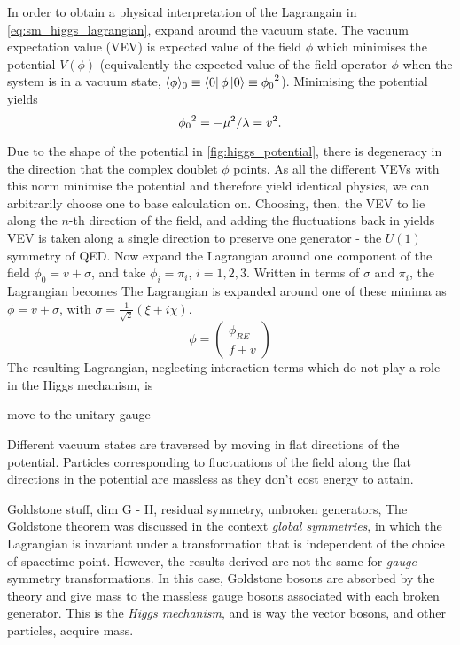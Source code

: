 In order to obtain a physical interpretation of the Lagrangain in \cref{eq:sm_higgs_lagrangian}, expand around the vacuum state.
The vacuum expectation value (VEV) is expected value of the field $\phi$ which minimises the potential $V(\phi)$ (equivalently the expected value of the field operator $\phi$ when the system is in a vacuum state, $\langle{\phi}\rangle_0 \equiv \left\langle 0 \right| \phi \left| 0 \right\rangle \equiv {\phi_0}^2$).
Minimising the potential yields
%
\begin{equation}\label{eq:higgs_vev}
  {\phi_0}^2 = -\mu^2 / \lambda = v^2 .
\end{equation}
%

Due to the shape of the potential in \cref{fig:higgs_potential}, there is degeneracy in the direction that the complex doublet $\phi$ points.
As all the different VEVs with this norm minimise the potential and therefore yield identical physics, we can arbitrarily choose one to base calculation on.
Choosing, then, the VEV to lie along the $n$\nobreakdash-th direction of the field, and adding the fluctuations back in yields
VEV is taken along a single direction to preserve one generator - the $U(1)$ symmetry of QED.
Now expand the Lagrangian around one component of the field $\phi_0 = v + \sigma$, and take $\phi_i = \pi_i$, $i = 1,2,3$. 
Written in terms of $\sigma$ and $\pi_i$, the Lagrangian becomes
The Lagrangian is expanded around one of these minima as $\phi = v + \sigma$, with $\sigma = \frac{1}{\sqrt{2}} (\xi + i \chi)$. 
%
\begin{equation}
  \phi = 
  \begin{pmatrix}
    \phi_{RE} \\ f + v
  \end{pmatrix}
\end{equation}
%
The resulting Lagrangian, neglecting interaction terms which do not play a role in the Higgs mechanism, is

move to the unitary gauge



Different vacuum states are traversed by moving in flat directions of the potential.
Particles corresponding to fluctuations of the field along the flat directions in the potential are massless as they don't cost energy to attain. 

Goldstone stuff, dim G - H, residual symmetry, unbroken generators,
The Goldstone theorem was discussed in the context \textit{global symmetries}, in which the Lagrangian is invariant under a transformation that is independent of the choice of spacetime point. However, the results derived are not the same for \textit{gauge} symmetry transformations. In this case, Goldstone bosons are absorbed by the theory and give mass to the massless gauge bosons associated with each broken generator. This is the \textit{Higgs mechanism}, and is way the vector bosons, and other particles, acquire mass.



